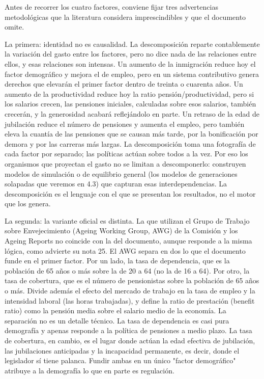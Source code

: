 \documentclass[10pt,a4paper]{article}
\begin{document}
Antes de recorrer los cuatro factores, conviene fijar tres advertencias metodológicas que la literatura considera imprescindibles y que el documento omite.

La primera: identidad no es causalidad. La descomposición reparte contablemente la variación del gasto entre los factores, pero no dice nada de las relaciones entre ellos, y esas relaciones son intensas. Un aumento de la inmigración reduce hoy el factor demográfico y mejora el de empleo, pero en un sistema contributivo genera derechos que elevarán el primer factor dentro de treinta o cuarenta años. Un aumento de la productividad reduce hoy la ratio pensión/productividad, pero si los salarios crecen, las pensiones iniciales, calculadas sobre esos salarios, también crecerán, y la generosidad acabará reflejándolo en parte. Un retraso de la edad de jubilación reduce el número de pensiones y aumenta el empleo, pero también eleva la cuantía de las pensiones que se causan más tarde, por la bonificación por demora y por las carreras más largas. La descomposición toma una fotografía de cada factor por separado; las políticas actúan sobre todos a la vez. Por eso los organismos que proyectan el gasto no se limitan a descomponerlo: construyen modelos de simulación o de equilibrio general (los modelos de generaciones solapadas que veremos en 4.3) que capturan esas interdependencias. La descomposición es el lenguaje con el que se presentan los resultados, no el motor que los genera.

La segunda: la variante oficial es distinta. La que utilizan el Grupo de Trabajo sobre Envejecimiento (Ageing Working Group, AWG) de la Comisión y los Ageing Reports no coincide con la del documento, aunque responde a la misma lógica, como advierte su nota 25. El AWG separa en dos lo que el documento funde en el primer factor. Por un lado, la tasa de dependencia, que es la población de 65 años o más sobre la de 20 a 64 (no la de 16 a 64). Por otro, la tasa de cobertura, que es el número de pensionistas sobre la población de 65 años o más. Divide además el efecto del mercado de trabajo en la tasa de empleo y la intensidad laboral (las horas trabajadas), y define la ratio de prestación (benefit ratio) como la pensión media sobre el salario medio de la economía. La separación no es un detalle técnico. La tasa de dependencia es casi pura demografía y apenas responde a la política de pensiones a medio plazo. La tasa de cobertura, en cambio, es el lugar donde actúan la edad efectiva de jubilación, las jubilaciones anticipadas y la incapacidad permanente, es decir, donde el legislador sí tiene palanca. Fundir ambas en un único "factor demográfico" atribuye a la demografía lo que en parte es regulación.
\end{document}
